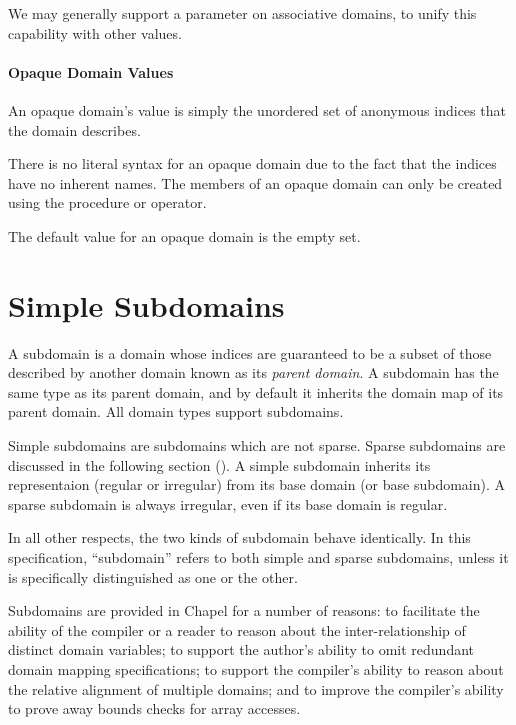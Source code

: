 \begin{future}
We may generally support a  parameter on associative
domains, to unify this capability with other values.
\end{future}

\paragraph{Opaque Domain Values}

An opaque domain's value is simply the unordered set of anonymous
indices that the domain describes.


There is no literal syntax for an opaque domain due to the fact that
the indices have no inherent names.  The members of an opaque domain can only be
created using the  procedure or \chpl{+} operator.


The default value for an opaque domain is the empty set.


\section{Simple Subdomains}
\label{Simple_Subdomains}

A subdomain is a domain whose indices are guaranteed to be a subset of
those described by another domain known as its \emph{parent domain}.
A subdomain has the same type as its parent domain, and by default
it inherits the domain map of its parent domain.  All domain types
support subdomains.

Simple subdomains are subdomains which are not sparse.  Sparse subdomains are
discussed in the following section ().  A simple
subdomain inherits its representaion (regular or irregular) from its base domain (or base
subdomain).  A sparse subdomain is always irregular, even if its base domain is
regular.  

In all other respects, the two kinds of subdomain behave identically.  In this
specification, ``subdomain'' refers to both simple and sparse subdomains, unless
it is specifically distinguished as one or the other.

\begin{rationale}
Subdomains are provided in Chapel for a number of reasons: to
facilitate the ability of the compiler or a reader to reason about the
inter-relationship of distinct domain variables; to support the
author's ability to omit redundant domain mapping specifications; to
support the compiler's ability to reason about the relative alignment
of multiple domains; and to improve the compiler's ability to prove
away bounds checks for array accesses.
\end{rationale}

